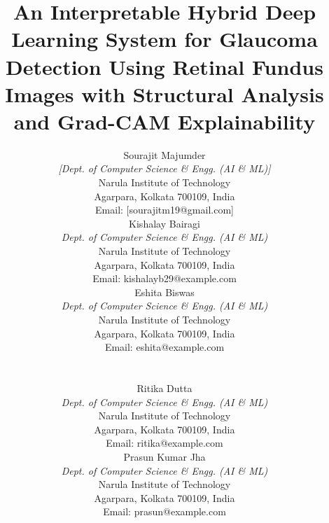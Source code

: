 \documentclass[conference]{IEEEtran}
\begin{document}
\title{\fontsize{24pt}{28pt}\selectfont
An Interpretable Hybrid Deep Learning System for Glaucoma Detection Using Retinal Fundus Images with Structural Analysis and Grad-CAM Explainability
}

\author{
\begin{minipage}[t]{0.31\textwidth}
\centering
\fontsize{9pt}{11pt}\selectfont Sourajit Majumder\\
\textit{[Dept. of Computer Science \& Engg. (AI \& ML)]}\\
Narula Institute of Technology\\
Agarpara, Kolkata 700109, India\\
\textup{Email: [sourajitm19@gmail.com]}
\end{minipage}
\hfill
\begin{minipage}[t]{0.31\textwidth}
\centering
\fontsize{9pt}{11pt}\selectfont Kishalay Bairagi\\
\textit{Dept. of Computer Science \& Engg. (AI \& ML)}\\
Narula Institute of Technology\\
Agarpara, Kolkata 700109, India\\
\textup{Email: kishalayb29@example.com}
\end{minipage}
\hfill
\begin{minipage}[t]{0.31\textwidth}
\centering
\fontsize{9pt}{11pt}\selectfont Eshita Biswas\\
\textit{Dept. of Computer Science \& Engg. (AI \& ML)}\\
Narula Institute of Technology\\
Agarpara, Kolkata 700109, India\\
\textup{Email: eshita@example.com}
\end{minipage}
\\[1em]
\begin{minipage}[t]{0.45\textwidth}
\centering
\fontsize{9pt}{11pt}\selectfont Ritika Dutta\\
\textit{Dept. of Computer Science \& Engg. (AI \& ML)}\\
Narula Institute of Technology\\
Agarpara, Kolkata 700109, India\\
\textup{Email: ritika@example.com}
\end{minipage}
\hfill
\begin{minipage}[t]{0.45\textwidth}
\centering
\fontsize{9pt}{11pt}\selectfont Prasun Kumar Jha\\
\textit{Dept. of Computer Science \& Engg. (AI \& ML)}\\
Narula Institute of Technology\\
Agarpara, Kolkata 700109, India\\
\textup{Email: prasun@example.com}
\end{minipage}
}
\end{document}
